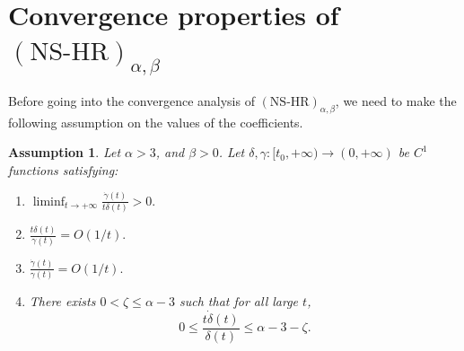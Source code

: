 \documentclass[11pt]{article}
\numberwithin{equation}{section}
\newtheorem{Assumption}{Assumption}[section]
\begin{document}
\section{Convergence properties of $(\text{NS-HR})_{\alpha,\beta}$}
Before going into the convergence analysis of $(\text{NS-HR})_{\alpha,\beta}$, we need to make the following assumption on the values of the coefficients.
\begin{Assumption}\label{ass:B}
Let $\alpha > 3$, and $\beta>0$.  
Let $\delta,\gamma:[t_0,+\infty)\to(0,+\infty)$ be $C^1$ functions satisfying:

\begin{enumerate}[label=(\roman*)]
    \item 
    $\displaystyle \liminf_{t\to +\infty} \frac{\dot{\gamma}(t)}{t\delta(t)} > 0.$

    \item
    $\displaystyle \frac{t\delta(t)}{\gamma(t)} = O(1/t).$

    \item
    $\displaystyle \frac{\dot{\gamma}(t)}{\gamma(t)} = O(1/t).$

    \item
    There exists $0<\zeta\le\alpha-3$ such that for all large $t$,
    \[
    0 \le  \frac{t\dot{\delta}(t)}{\delta(t)} \le \alpha - 3 - \zeta.
    \]
\end{enumerate}
\end{Assumption}
\end{document}
